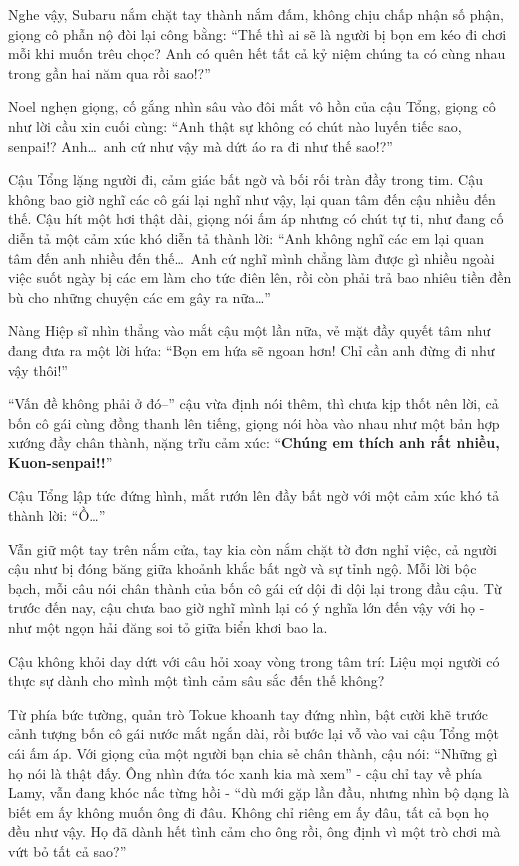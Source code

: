 \documentclass[../main.tex]{subfiles}
\begin{document}
Nghe vậy, Subaru nắm chặt tay thành nắm đấm, không chịu chấp nhận số phận, giọng cô phẫn nộ đòi lại công bằng: ``Thế thì ai sẽ là người bị bọn em kéo đi chơi mỗi khi muốn trêu chọc? Anh có quên hết tất cả kỷ niệm chúng ta có cùng nhau trong gần hai năm qua rồi sao!?''

Noel nghẹn giọng, cố gắng nhìn sâu vào đôi mắt vô hồn của cậu Tổng, giọng cô như lời cầu xin cuối cùng: ``Anh thật sự không có chút nào luyến tiếc sao, senpai!? Anh\dots\ anh cứ như vậy mà dứt áo ra đi như thế sao!?''

Cậu Tổng lặng người đi, cảm giác bất ngờ và bối rối tràn đầy trong tim. Cậu không bao giờ nghĩ các cô gái lại nghĩ như vậy, lại quan tâm đến cậu nhiều đến thế. Cậu hít một hơi thật dài, giọng nói ấm áp nhưng có chút tự ti, như đang cố diễn tả một cảm xúc khó diễn tả thành lời: ``Anh không nghĩ các em lại quan tâm đến anh nhiều đến thế\dots\ Anh cứ nghĩ mình chẳng làm được gì nhiều ngoài việc suốt ngày bị các em làm cho tức điên lên, rồi còn phải trả bao nhiêu tiền đền bù cho những chuyện các em gây ra nữa\dots''

Nàng Hiệp sĩ nhìn thẳng vào mắt cậu một lần nữa, vẻ mặt đầy quyết tâm như đang đưa ra một lời hứa: ``Bọn em hứa sẽ ngoan hơn! Chỉ cần anh đừng đi như vậy thôi!''

``Vấn đề không phải ở đó--'' cậu vừa định nói thêm, thì chưa kịp thốt nên lời, cả bốn cô gái cùng đồng thanh lên tiếng, giọng nói hòa vào nhau như một bản hợp xướng đầy chân thành, nặng trĩu cảm xúc: ``\textbf{Chúng em thích anh rất nhiều, Kuon-senpai!!}''

Cậu Tổng lập tức đứng hình, mắt rướn lên đầy bất ngờ với một cảm xúc khó tả thành lời: ``Ồ\dots''

Vẫn giữ một tay trên nắm cửa, tay kia còn nắm chặt tờ đơn nghỉ việc, cả người cậu như bị đóng băng giữa khoảnh khắc bất ngờ và sự tỉnh ngộ. Mỗi lời bộc bạch, mỗi câu nói chân thành của bốn cô gái cứ dội đi dội lại trong đầu cậu. Từ trước đến nay, cậu chưa bao giờ nghĩ mình lại có ý nghĩa lớn đến vậy với họ - như một ngọn hải đăng soi tỏ giữa biển khơi bao la.

Cậu không khỏi day dứt với câu hỏi xoay vòng trong tâm trí: Liệu mọi người có thực sự dành cho mình một tình cảm sâu sắc đến thế không?

Từ phía bức tường, quản trò Tokue khoanh tay đứng nhìn, bật cười khẽ trước cảnh tượng bốn cô gái nước mắt ngắn dài, rồi bước lại vỗ vào vai cậu Tổng một cái ấm áp. Với giọng của một người bạn chia sẻ chân thành, cậu nói: ``Những gì họ nói là thật đấy. Ông nhìn đứa tóc xanh kia mà xem'' - cậu chỉ tay về phía Lamy, vẫn đang khóc nấc từng hồi - ``dù mới gặp lần đầu, nhưng nhìn bộ dạng là biết em ấy không muốn ông đi đâu. Không chỉ riêng em ấy đâu, tất cả bọn họ đều như vậy. Họ đã dành hết tình cảm cho ông rồi, ông định vì một trò chơi mà vứt bỏ tất cả sao?''
\end{document}
